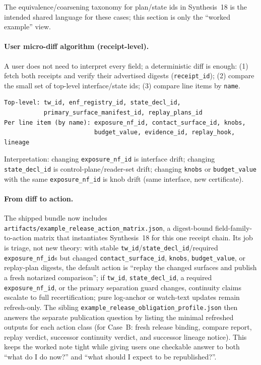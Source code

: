\documentclass[11pt]{article}
\begin{document}
The equivalence/coarsening taxonomy for plan/state ids in Synthesis~18 is the intended shared language for these cases; this section is only the ``worked example'' view.\cite{series:planstateequiv}

\paragraph{User micro-diff algorithm (receipt-level).}
A user does not need to interpret every field; a deterministic diff is enough:
(1) fetch both receipts and verify their advertised digests (\texttt{receipt\_id});
(2) compare the small set of top-level interface/state ids;
(3) compare line items by \texttt{name}.
\begin{verbatim}
Top-level: tw_id, enf_registry_id, state_decl_id,
           primary_surface_manifest_id, replay_plans_id
Per line item (by name): exposure_nf_id, contact_surface_id, knobs,
                         budget_value, evidence_id, replay_hook, lineage
\end{verbatim}
Interpretation: changing \texttt{exposure\_nf\_id} is interface drift; changing \texttt{state\_decl\_id} is control-plane/reader-set drift; changing \texttt{knobs} or \texttt{budget\_value} with the same \texttt{exposure\_nf\_id} is knob drift (same interface, new certificate).

\paragraph{From diff to action.}
The shipped bundle now includes \texttt{artifacts/example\_release\_action\_matrix.json}, a digest-bound field-family-to-action matrix that instantiates Synthesis~18 for this one receipt chain.
Its job is triage, not new theory: with stable \texttt{tw\_id}/\texttt{state\_decl\_id}/required \texttt{exposure\_nf\_id}s but changed \texttt{contact\_surface\_id}, \texttt{knobs}, \texttt{budget\_value}, or replay-plan digests, the default action is ``replay the changed surfaces and publish a fresh notarized comparison''; if \texttt{tw\_id}, \texttt{state\_decl\_id}, a required \texttt{exposure\_nf\_id}, or the primary separation guard changes, continuity claims escalate to full recertification; pure log-anchor or watch-text updates remain refresh-only. The sibling \texttt{example\_release\_obligation\_profile.json} then answers the separate publication question by listing the minimal refreshed outputs for each action class (for Case~B: fresh release binding, compare report, replay verdict, successor continuity verdict, and successor lineage notice). This keeps the worked note tight while giving users one checkable answer to both ``what do I do now?'' and ``what should I expect to be republished?''.
\end{document}
